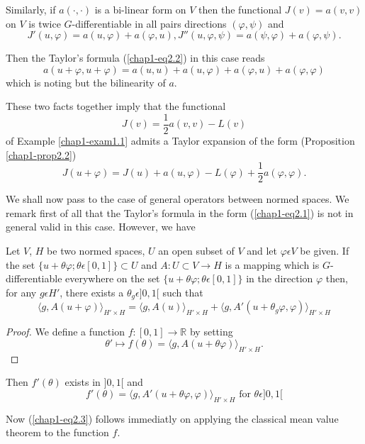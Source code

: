 Similarly, if $a(\cdot, \cdot)$ is a bi-linear form on $V$ then the functional $J(v) = a(v, v)$ on $V$ is twice $G$-differentiable in all pairs directions $(\varphi, \psi)$ and 
$$
J'(u, \varphi) = a(u, \varphi) + a(\varphi, u), J''(u, \varphi, \psi) = a(\psi, \varphi) + a(\varphi, \psi).
$$

Then the Taylor's formula (\ref{chap1-eq2.2}) in this case reads
$$
a(u + \varphi, u + \varphi) = a(u, u) + a(u, \varphi) + a(\varphi, u) + a(\varphi, \varphi)
$$
which is noting but the bilinearity of $a$.

These two facts together imply that the functional
$$
J(v) = \frac{1}{2} a(v, v) - L(v)
$$
of Example \ref{chap1-exam1.1} admits a Taylor expansion of the form (Proposition \ref{chap1-prop2.2})
$$
J(u + \varphi) = J(u) + a(u, \varphi) - L(\varphi) + \frac{1}{2}a(\varphi, \varphi).
$$

We shall now pass to the case of general operators between normed spaces. We remark first of all that the Taylor's formula in the form (\ref{chap1-eq2.1}) is not in general valid in this case. However, we have

\begin{proposition}\label{chap1-prop2.3}
Let $V$, $H$ be two normed spaces, $U$ an open subset of $V$ and let $\varphi \epsilon V$ be given. If the set $\{u + \theta \varphi ; \theta \epsilon [0, 1]\} \subset U$ and $A : U \subset V \to H$ is a mapping which is $G$-differentiable everywhere on the set $\{u + \theta \varphi ; \theta \epsilon [0, 1]\}$ in the direction $\varphi$ then, for any $g \epsilon H'$, there exists a $\theta_{g} \epsilon ]0, 1[$ such that
\begin{equation*}
 \langle g, A (u + \varphi) \rangle_{H' \times H} = \langle g, A(u) \rangle_{H' \times H} + \langle g, A'(u + \theta_{g} \varphi, \varphi) \rangle_{H' \times H}\tag{2.3}\label{chap1-eq2.3}
\end{equation*}
\end{proposition}

\begin{proof}
We define a function $f : [0, 1] \to \mathbb{R}$ by setting
$$
\theta' \mapsto f(\theta) = \langle g, A(u + \theta \varphi) \rangle_{H' \times H}.
$$\pageoriginale
\end{proof}

Then $f'(\theta)$ exists in $]0,1[$ and 
$$
f'(\theta) =  \langle g, A'(u + \theta \varphi, \varphi) \rangle_{H' \times H} \text{ for } \theta \epsilon ]0, 1[
$$ 

Now (\ref{chap1-eq2.3}) follows immediatly on applying the classical mean value theorem to the function $f$.

